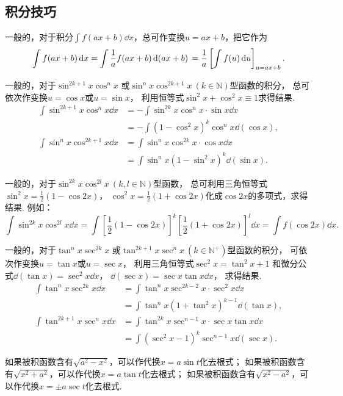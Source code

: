 \subsection{积分技巧}
一般的，对于积分\(\int f(ax+b) \dd{x}\)，总可作变换\(u=ax+b\)，把它作为\[
	\int f(ax+b) \dd{x}
	= \int \frac{1}{a} f(ax+b) \dd{(ax+b)} \\
	= \frac{1}{a} \left[ \int f(u) \dd{u} \right]_{u=ax+b}.
\]

一般的，对于\(\sin^{2k+1} x \cos^n x\)
或\(\sin^n x \cos^{2k+1} x\ (k \in \mathbb{N})\)型函数的积分，
总可依次作变换\(u=\cos x\)或\(u=\sin x\)，
利用恒等式\(\sin^2 x + \cos^2 x \equiv 1\)求得结果.
\begin{align*}
	\int \sin^{2k+1} x \cos^n x \dd{x}
	&= - \int \sin^{2k} x \cos^n x \cdot \sin x \dd{x} \\
	&= - \int (1-\cos^2 x)^k \cos^n x \dd(\cos x), \\
	\int \sin^n x \cos^{2k+1} x \dd{x}
	&= \int \sin^n x \cos^{2k} x \cdot \cos x \dd{x} \\
	&= \int \sin^n x (1-\sin^2 x)^k \dd(\sin x).
\end{align*}

一般的，对于\(\sin^{2k} x \cos^{2l} x\ (k,l \in \mathbb{N})\)型函数，
总可利用三角恒等式\(\sin^2 x = \frac{1}{2}(1-\cos 2x)\)，
\(\cos^2 x = \frac{1}{2}(1+\cos 2x)\)化成\(\cos 2x\)的多项式，求得结果.
例如：\[
	\int \sin^{2k} x \cos^{2l} x \dd{x}
	= \int \left[\frac{1}{2}(1-\cos 2x)\right]^k
		\left[\frac{1}{2}(1+\cos 2x)\right]^l \dd{x}
	= \int f(\cos 2x) \dd{x}.
\]

一般的，对于\(\tan^n x \sec^{2k} x\)
或\(\tan^{2k+1} x \sec^n x\ (k \in \mathbb{N}^+)\)型函数的积分，
可依次作变换\(u=\tan x\)或\(u=\sec x\)，
利用三角恒等式\(\sec^2 x = \tan^2 x + 1\)
和微分公式\(\dd(\tan x) = \sec^2 x \dd{x}\)，
\(\dd(\sec x) = \sec x \tan x \dd{x}\)，
求得结果.
\begin{align*}
	\int \tan^n x \sec^{2k} x \dd{x}
	&=\int \tan^n x\sec^{2k-2} x \cdot \sec^2 x \dd{x} \\
	&=\int \tan^n x(1+\tan^2 x)^{k-1} \dd(\tan x), \\
	\int \tan^{2k+1} x \sec^n x \dd{x}
	&=\int \tan^{2k} x \sec^{n-1} x \cdot \sec x\tan x\dd{x} \\
	&=\int (\sec^2 x - 1)^k \sec^{n-1} x \dd(\sec x).
\end{align*}

如果被积函数含有\(\sqrt{a^2 - x^2}\)，可以作代换\(x = a \sin t\)化去根式；
如果被积函数含有\(\sqrt{x^2 + a^2}\)，可以作代换\(x=a \tan t\)化去根式；
如果被积函数含有\(\sqrt{x^2 - a^2}\)，可以作代换\(x=\pm a \sec t\)化去根式.

